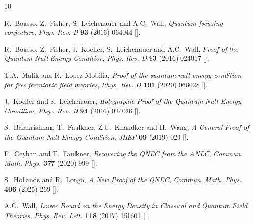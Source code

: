 \documentclass[11pt,a4paper]{article}
\theoremstyle{plain}
\numberwithin{theorem}{section}
\theoremstyle{definition}
\newcommand{\?}{\overset{?}{=}}
\begin{document}
\providecommand{\href}[2]{#2}\begingroup\raggedright\begin{thebibliography}{10}

R.~Bousso, Z.~Fisher, S.~Leichenauer and A.C.~Wall, \emph{{Quantum focusing
  conjecture}}, \href{https://doi.org/10.1103/PhysRevD.93.064044}{\emph{Phys.
  Rev. D} {\bfseries 93} (2016) 064044}
  [\href{https://arxiv.org/abs/1506.02669}{{}}].

R.~Bousso, Z.~Fisher, J.~Koeller, S.~Leichenauer and A.C.~Wall, \emph{{Proof of
  the Quantum Null Energy Condition}},
  \href{https://doi.org/10.1103/PhysRevD.93.024017}{\emph{Phys. Rev. D}
  {\bfseries 93} (2016) 024017}
  [\href{https://arxiv.org/abs/1509.02542}{{}}].

T.A.~Malik and R.~Lopez-Mobilia, \emph{{Proof of the quantum null energy
  condition for free fermionic field theories}},
  \href{https://doi.org/10.1103/PhysRevD.101.066028}{\emph{Phys. Rev. D}
  {\bfseries 101} (2020) 066028}
  [\href{https://arxiv.org/abs/1910.07594}{{}}].

J.~Koeller and S.~Leichenauer, \emph{{Holographic Proof of the Quantum Null
  Energy Condition}},
  \href{https://doi.org/10.1103/PhysRevD.94.024026}{\emph{Phys. Rev. D}
  {\bfseries 94} (2016) 024026}
  [\href{https://arxiv.org/abs/1512.06109}{{}}].

S.~Balakrishnan, T.~Faulkner, Z.U.~Khandker and H.~Wang, \emph{{A General Proof
  of the Quantum Null Energy Condition}},
  \href{https://doi.org/10.1007/JHEP09(2019)020}{\emph{JHEP} {\bfseries 09}
  (2019) 020} [\href{https://arxiv.org/abs/1706.09432}{{}}].

F.~Ceyhan and T.~Faulkner, \emph{{Recovering the QNEC from the ANEC}},
  \href{https://doi.org/10.1007/s00220-020-03751-y}{\emph{Commun. Math. Phys.}
  {\bfseries 377} (2020) 999}
  [\href{https://arxiv.org/abs/1812.04683}{{}}].

S.~Hollands and R.~Longo, \emph{{A New Proof of the QNEC}},
  \href{https://doi.org/10.1007/s00220-025-05450-y}{\emph{Commun. Math. Phys.}
  {\bfseries 406} (2025) 269}
  [\href{https://arxiv.org/abs/2503.04651}{{}}].

A.C.~Wall, \emph{{Lower Bound on the Energy Density in Classical and Quantum
  Field Theories}},
  \href{https://doi.org/10.1103/PhysRevLett.118.151601}{\emph{Phys. Rev. Lett.}
  {\bfseries 118} (2017) 151601}
  [\href{https://arxiv.org/abs/1701.03196}{{}}].


\end{thebibliography}
\end{document}
